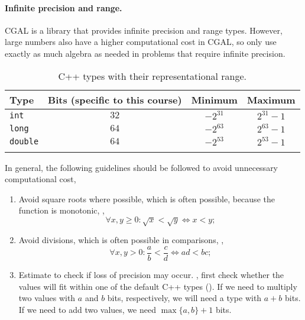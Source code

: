 \documentclass[justified,nobib]{tufte-handout}
\begin{document}
\paragraph{Infinite precision and range.}

CGAL is a library that provides infinite precision and range types. However, large numbers
also have a higher computational cost in CGAL, so only use exactly as much
algebra as needed in problems that require infinite precision.

\begin{table}[h]
    \centering
    \caption{C++ types with their representational range.}
    \label{tab:types}
    \begin{tabular}{lccc} \toprule
        Type            & Bits (specific to this course) & Minimum   & Maximum    \\
        \midrule
        \texttt{int}    & $32$                           & $-2^{31}$ & $2^{31}-1$ \\
        \texttt{long}   & $64$                           & $-2^{63}$ & $2^{63}-1$ \\
        \texttt{double} & $64$                           & $-2^{53}$ & $2^{53}-1$ \\
        \bottomrule                                                               \\
    \end{tabular}
\end{table}

In general, the following guidelines should be followed to avoid unnecessary
computational cost,
\begin{enumerate}
    \item Avoid square roots where possible, which is often possible, because the
          function is monotonic, \ie, \[
              \forall x,y \geq 0 : \sqrt{x} < \sqrt{y} \iff x < y
              ;\]
    \item Avoid divisions, which is often possible in comparisons,
          \ie, \[
              \forall x,y > 0 : \frac{a}{b} < \frac{c}{d} \iff ad < bc
              ;\]
    \item Estimate to check if loss of precision may occur. \Ie, first check
          whether the values will fit within one of the default C++ types
          (). If we need to multiply two values with $a$ and $b$
          bits, respectively, we will need a type with $a+b$ bits. If we need to add
          two values, we need $\max\{a,b\}+1$ bits.
\end{enumerate}
\end{document}
